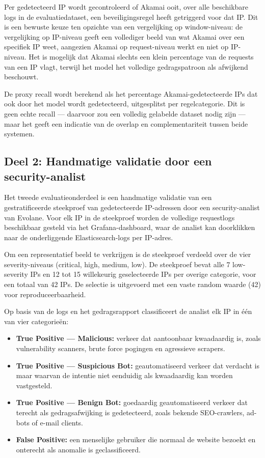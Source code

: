 Per gedetecteerd IP wordt gecontroleerd of Akamai ooit, over alle beschikbare logs in de evaluatiedataset, een beveiligingsregel heeft getriggerd voor dat IP. Dit is een bewuste keuze ten opzichte van een vergelijking op window-niveau: de vergelijking op IP-niveau geeft een vollediger beeld van wat Akamai over een specifiek IP weet, aangezien Akamai op request-niveau werkt en niet op IP-niveau. Het is mogelijk dat Akamai slechts een klein percentage van de requests van een IP vlagt, terwijl het model het volledige gedragspatroon als afwijkend beschouwt.
 
De proxy recall wordt berekend als het percentage Akamai-gedetecteerde IPs dat ook door het model wordt gedetecteerd, uitgesplitst per regelcategorie. Dit is geen echte recall — daarvoor zou een volledig gelabelde dataset nodig zijn — maar het geeft een indicatie van de overlap en complementariteit tussen beide systemen.
 
\subsection{Deel 2: Handmatige validatie door een security-analist}
\label{subsec:eval-handmatige-validatie}
 
Het tweede evaluatieonderdeel is een handmatige validatie van een gestratificeerde steekproef van gedetecteerde IP-adressen door een security-analist van Evolane. Voor elk IP in de steekproef worden de volledige requestlogs beschikbaar gesteld via het Grafana-dashboard, waar de analist kan doorklikken naar de onderliggende Elasticsearch-logs per IP-adres.
 
Om een representatief beeld te verkrijgen is de steekproef verdeeld over de vier severity-niveaus (critical, high, medium, low). De steekproef bevat alle 7 low-severity IPs en 12 tot 15 willekeurig geselecteerde IPs per overige categorie, voor een totaal van 42 IPs. De selectie is uitgevoerd met een vaste random waarde (42) voor reproduceerbaarheid.
 
Op basis van de logs en het gedragsrapport classificeert de analist elk IP in één van vier categorieën:
 
\begin{itemize}
    \item \textbf{True Positive --- Malicious:} verkeer dat aantoonbaar kwaadaardig is, zoals vulnerability scanners, brute force pogingen en agressieve scrapers.
    \item \textbf{True Positive --- Suspicious Bot:} geautomatiseerd verkeer dat verdacht is maar waarvan de intentie niet eenduidig als kwaadaardig kan worden vastgesteld.
    \item \textbf{True Positive --- Benign Bot:} goedaardig geautomatiseerd verkeer dat terecht als gedragsafwijking is gedetecteerd, zoals bekende SEO-crawlers, ad-bots of e-mail clients.
    \item \textbf{False Positive:} een menselijke gebruiker die normaal de website bezoekt en onterecht als anomalie is geclassificeerd.
\end{itemize}
 
